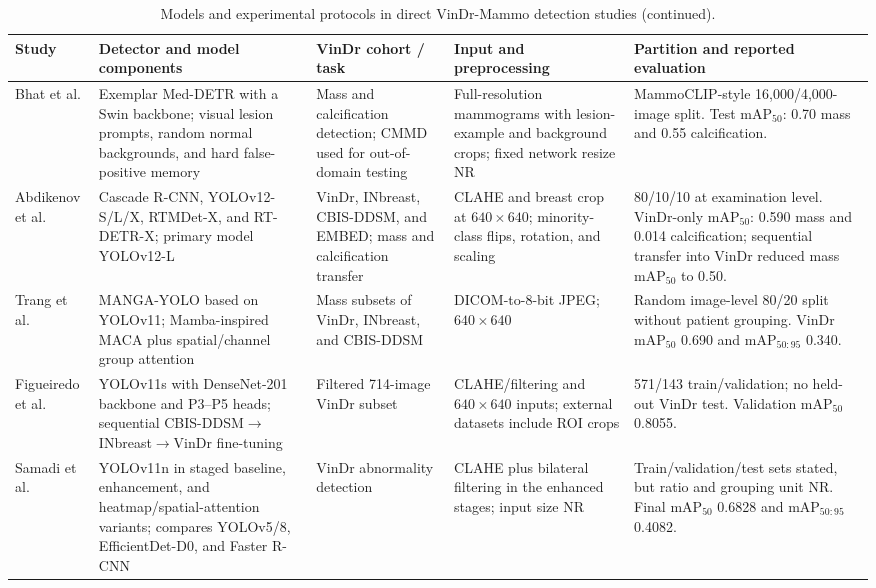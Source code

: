 \begin{table}[t]
\ContinuedFloat
\centering
\caption{Models and experimental protocols in direct VinDr-Mammo detection studies (continued).}
\scriptsize
\setlength{\tabcolsep}{2.6pt}
\renewcommand{\arraystretch}{1.13}
\begin{threeparttable}
\begin{tabularx}{\textwidth}{@{}>{\raggedright\arraybackslash}p{2.05cm}>{\raggedright\arraybackslash}p{3.35cm}>{\raggedright\arraybackslash}p{2.55cm}>{\raggedright\arraybackslash}p{2.75cm}X@{}}
\toprule
Study & Detector and model components & VinDr cohort / task & Input and preprocessing & Partition and reported evaluation \\
\midrule
Bhat et al. \cite{bhat2025exemplar} & Exemplar Med-DETR with a Swin backbone; visual lesion prompts, random normal backgrounds, and hard false-positive memory & Mass and calcification detection; CMMD used for out-of-domain testing & Full-resolution mammograms with lesion-example and background crops; fixed network resize NR & MammoCLIP-style 16,000/4,000-image split. Test mAP$_{50}$: 0.70 mass and 0.55 calcification. \\
Abdikenov et al. \cite{abdikenov2025transfer} & Cascade R-CNN, YOLOv12-S/L/X, RTMDet-X, and RT-DETR-X; primary model YOLOv12-L & VinDr, INbreast, CBIS-DDSM, and EMBED; mass and calcification transfer & CLAHE and breast crop at $640\!\times\!640$; minority-class flips, rotation, and scaling & 80/10/10 at examination level. VinDr-only mAP$_{50}$: 0.590 mass and 0.014 calcification; sequential transfer into VinDr reduced mass mAP$_{50}$ to 0.50. \\
Trang et al. \cite{trang2025manga} & MANGA-YOLO based on YOLOv11; Mamba-inspired MACA plus spatial/channel group attention & Mass subsets of VinDr, INbreast, and CBIS-DDSM & DICOM-to-8-bit JPEG; $640\!\times\!640$ & Random image-level 80/20 split without patient grouping. VinDr mAP$_{50}$ 0.690 and mAP$_{50:95}$ 0.340. \\
Figueiredo et al. \cite{figueiredo2026progressive} & YOLOv11s with DenseNet-201 backbone and P3--P5 heads; sequential CBIS-DDSM$\rightarrow$INbreast$\rightarrow$VinDr fine-tuning & Filtered 714-image VinDr subset & CLAHE/filtering and $640\!\times\!640$ inputs; external datasets include ROI crops & 571/143 train/validation; no held-out VinDr test. Validation mAP$_{50}$ 0.8055. \\
Samadi et al. \cite{samadi2026yolo} & YOLOv11n in staged baseline, enhancement, and heatmap/spatial-attention variants; compares YOLOv5/8, EfficientDet-D0, and Faster R-CNN & VinDr abnormality detection & CLAHE plus bilateral filtering in the enhanced stages; input size NR & Train/validation/test sets stated, but ratio and grouping unit NR. Final mAP$_{50}$ 0.6828 and mAP$_{50:95}$ 0.4082. \\

\end{tabularx}
\end{threeparttable}
\end{table}
